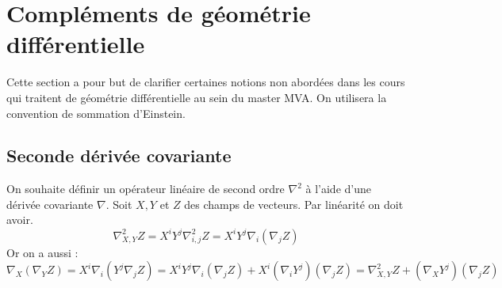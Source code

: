 \documentclass[11pt]{article}
\begin{document}
	\appendix
	
	
	
	
	\section{Compléments de géométrie différentielle}
	
	Cette section a pour but de clarifier certaines notions non abordées dans les cours qui traitent de géométrie différentielle au sein du master MVA. On utilisera la convention de sommation d'Einstein.
	
	\subsection{Seconde dérivée covariante}
	
	On souhaite définir un opérateur linéaire de second ordre $\nabla^2$ à l'aide d'une dérivée covariante $\nabla$. Soit $X, Y$ et $Z$ des champs de vecteurs. Par linéarité on doit avoir.
	$$ \nabla_{X, Y}^2 Z = X^i Y^j \nabla_{i, j}^2 Z = X^i Y^j \nabla_i \left( \nabla_j Z \right) $$
	Or on a aussi :
	$$ \nabla_X \left( \nabla_Y Z \right) = X^i \nabla_i \left( Y^j \nabla_j Z \right) = X^i Y^j \nabla_i \left( \nabla_j Z \right) + X^i \left( \nabla_i Y^j \right) \left( \nabla_j Z \right) = \nabla_{X, Y}^2 Z + \left( \nabla_X Y^j \right) \left( \nabla_j Z \right) $$
\end{document}
